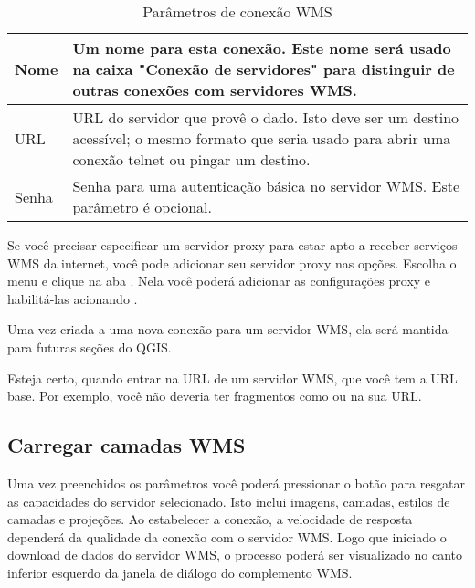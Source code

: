\begin{table}[ht]
\centering
 \begin{tabular}{|l|p{5in}|}
\hline Nome & Um nome para esta conexão. Este nome será usado na caixa "Conexão de servidores" para distinguir de outras conexões com servidores WMS. \\
\hline URL \index{WMS!URL} & URL do servidor que provê o dado. Isto deve ser um destino acessível; o mesmo formato que seria usado para abrir uma conexão telnet ou pingar um destino. \\
\hline Senha & Senha para uma autenticação básica no servidor WMS. Este parâmetro é opcional.\\
\hline
\end{tabular}
\caption{Parâmetros de conexão WMS}\label{tab:wms_connection_parms}
\end{table}

Se você precisar especificar um servidor proxy para estar apto a receber serviços WMS da internet, você pode adicionar seu servidor proxy nas opções.
Escolha o menu   \arrow {} e clique na aba . Nela você poderá adicionar as configurações proxy e habilitá-las acionando  .

Uma vez criada a uma nova conexão para um servidor WMS, ela será mantida para futuras seções do QGIS.

\begin{Tip}[ht]\caption{\textsc{Em URLs de servidores WMS}}
Esteja certo, quando entrar na URL de um servidor WMS, que você tem a URL base. Por exemplo, você não deveria ter fragmentos como  ou na sua URL.
\end{Tip}

\subsection{Carregar camadas WMS}\label{sec:ogc-wms-layers}

Uma vez preenchidos os parâmetros você poderá pressionar o botão
 para resgatar as capacidades do servidor selecionado. Isto inclui imagens, camadas, estilos de camadas e projeções. Ao estabelecer a conexão, a velocidade de resposta dependerá da qualidade da conexão com o servidor WMS. Logo que iniciado o download de dados do servidor WMS, o processo poderá ser visualizado no canto inferior esquerdo da janela de diálogo do complemento WMS.

